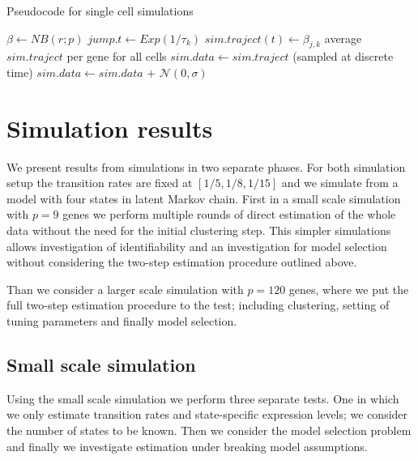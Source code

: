 \begin{algorithm}
    \caption{Pseudocode for single cell simulations}\label{alg:simulation-framework}
    \begin{algorithmic}[0]
        \State $\beta \gets   NB(r;p)$
        \State $jump.t \gets Exp(1/\tau_k)$
        \State $sim.traject(t) \gets \beta_{j,k}$
        \EndWhile
        \EndFor
        \EndFor
        \State average $sim.traject$ per gene for all cells
        \State $sim.data \gets sim.traject$ (sampled at discrete time)
        \State $sim.data \gets sim.data$ + $\mathcal{N}(0, \sigma)$
        \EndProcedure
      \end{algorithmic}
\end{algorithm}

\section{Simulation results}
\label{sec:results}

We present results from simulations in two separate phases. For both simulation setup the transition rates are fixed at $[1/5, 1/8, 1/15]$ and we simulate from a model with four states in latent Markov chain. First in a small scale simulation with $p=9$ genes we perform multiple rounds of direct estimation of the whole data without the need for the initial clustering step. This simpler simulations allows investigation of identifiability and an investigation for model selection without considering the two-step estimation procedure outlined above.

Than we consider a larger scale simulation with $p=120$ genes, where we put the full two-step estimation procedure to the test; including clustering, setting of tuning parameters and finally model selection.



\subsection{Small scale simulation}
\label{sec:small-scale-model}

Using the small scale simulation we perform three separate  tests. One in which we only estimate transition rates and state-specific expression levels; we consider the number of states to be known. Then we consider the model selection problem and finally we investigate estimation under breaking model assumptions.

